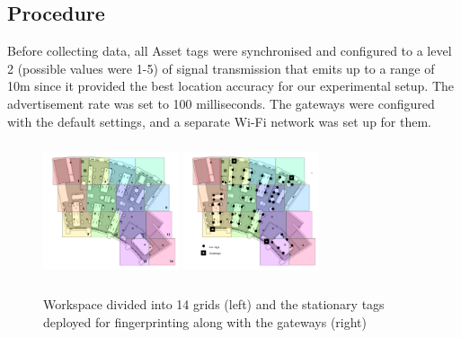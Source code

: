 \documentclass[acmtog]{acmart}
\begin{document}
\subsection{Procedure}
Before collecting data, all Asset tags were synchronised and configured to a level 2 (possible values were 1-5) of signal transmission that emits up to a range of 10m since it provided the best location accuracy for our experimental setup. The advertisement rate was set to 100 milliseconds. The gateways were configured with the default settings, and a separate Wi-Fi network was set up for them. 
\begin{figure}[h]
  \centering
  \includegraphics[width=4cm,height=4cm,keepaspectratio]{grids.png}
  \includegraphics[width=4cm,height=4cm,keepaspectratio]{sensors_grids.png}
  \caption{Workspace divided into 14 grids (left) and the stationary tags deployed for fingerprinting along with the gateways (right)}
  \label{Memkogrids}
  \end{figure}
\end{document}
